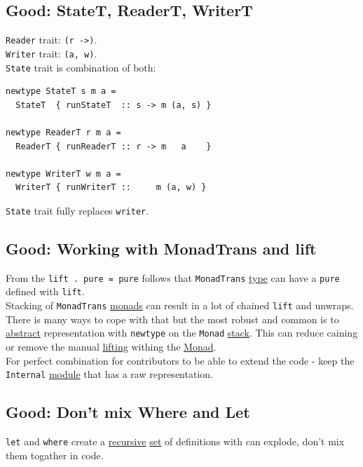 \documentclass[11pt]{article}
\begin{document}
\subsection{\label{org2a91c89}Good: StateT, ReaderT, WriterT}
\label{sec:org553fcf1}
\texttt{Reader} trait: \texttt{(r ->)}.\\

\texttt{Writer} trait: \texttt{(a, w)}.\\

\texttt{State} trait is combination of both:\\
\begin{verbatim}
newtype StateT s m a =
  StateT  { runStateT  :: s -> m (a, s) }

newtype ReaderT r m a =
  ReaderT { runReaderT :: r -> m   a    }

newtype WriterT w m a =
  WriterT { runWriterT ::     m (a, w) }
\end{verbatim}

\texttt{State} trait fully replaces \texttt{writer}.\\

\subsection{\label{org188e25e}Good: Working with MonadTrans and lift}
\label{sec:org219892d}
From the \texttt{lift . pure = pure} follows that \texttt{MonadTrans} \hyperref[orgc4aea2f]{type} can have a \texttt{pure} defined with \texttt{lift}.\\

Stacking of \texttt{MonadTrans} \hyperref[org0d4a4ef]{monads} can result in a lot of chained \texttt{lift} and unwraps. There is many ways to cope with that but the most robust and common is to \hyperref[orgbbe9132]{abstract} representation with \texttt{newtype} on the \texttt{Monad} \hyperref[org02af145]{stack}. This can reduce caining or remove the manual \hyperref[orgc8f2687]{lifting} withing the \hyperref[org86a5d95]{Monad}.\\
For perfect combination for contributors to be able to extend the code - keep the \texttt{Internal} \hyperref[org5699463]{module} that has a raw representation.\\

\subsection{\label{orgabdeba7}Good: Don't mix Where and Let}
\label{sec:orgc560c08}
\texttt{let} and \texttt{where} create a \hyperref[orgf513e66]{recursive} \hyperref[org1faf06d]{set} of definitions with can explode, don't mix them togather in code.\\
\end{document}
